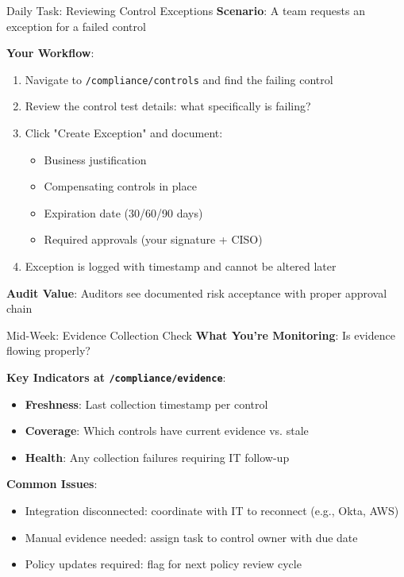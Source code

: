 \documentclass[aspectratio=169]{beamer}
\begin{document}
\begin{frame}{Daily Task: Reviewing Control Exceptions}
  \textbf{Scenario}: A team requests an exception for a failed control
  
  \vspace{0.3cm}
  
  \textbf{Your Workflow}:
  \begin{enumerate}
    \item Navigate to \texttt{/compliance/controls} and find the failing control
    \item Review the control test details: what specifically is failing?
    \item Click "Create Exception" and document:
      \begin{itemize}
        \item Business justification
        \item Compensating controls in place
        \item Expiration date (30/60/90 days)
        \item Required approvals (your signature + CISO)
      \end{itemize}
    \item Exception is logged with timestamp and cannot be altered later
  \end{enumerate}
  
  \vspace{0.3cm}
  
  \textbf{Audit Value}: Auditors see documented risk acceptance with proper approval chain
\end{frame}

\begin{frame}{Mid-Week: Evidence Collection Check}
  \textbf{What You're Monitoring}: Is evidence flowing properly?
  
  \vspace{0.3cm}
  
  \textbf{Key Indicators at \texttt{/compliance/evidence}}:
  \begin{itemize}
    \item \textbf{Freshness}: Last collection timestamp per control
    \item \textbf{Coverage}: Which controls have current evidence vs. stale
    \item \textbf{Health}: Any collection failures requiring IT follow-up
  \end{itemize}
  
  \vspace{0.3cm}
  
  \textbf{Common Issues}:
  \begin{itemize}
    \item Integration disconnected: coordinate with IT to reconnect (e.g., Okta, AWS)
    \item Manual evidence needed: assign task to control owner with due date
    \item Policy updates required: flag for next policy review cycle
  \end{itemize}
\end{frame}
\end{document}
